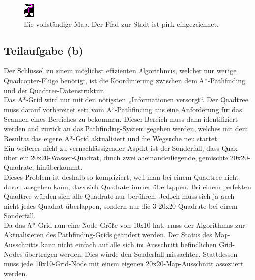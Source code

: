 \documentclass[a4paper,12pt]{article}
\begin{document}
\begin{figure}[H]
\centering
    \includegraphics[width=.5\linewidth]{Bilder/Aufgabe3/Teilaufgabe_A/Beispiel_04.png}
    \caption{Die vollständige Map. Der Pfad zur Stadt ist pink eingezeichnet.}
\end{figure}

\subsection{Teilaufgabe (b)}
Der Schlüssel zu einem möglichst effizienten Algorithmus, welcher nur wenige Quadcopter-Flüge benötigt, ist die Koordinierung zwischen dem A*-Pathfinding und der Quadtree-Datenstruktur.
\\[0.4cm]
Das A*-Grid wird nur mit den nötigsten „Informationen versorgt“.
Der Quadtree muss darauf vorbereitet sein vom A*-Pathfinding aus eine Anforderung für das Scannen eines Bereiches zu bekommen. Dieser Bereich muss dann identifiziert werden und zurück an das Pathfinding-System gegeben werden, welches mit dem Resultat das eigene A*-Grid aktualisiert und die Wegsuche neu startet.
\\[0.4cm]
Ein weiterer nicht zu vernachlässigender Aspekt ist der Sonderfall, dass Quax über ein 20x20-Wasser-Quadrat, durch zwei aneinanderliegende, gemischte 20x20-Quadrate, hinüberkommt.
\\[0.4cm]
Dieses Problem ist deshalb so kompliziert, weil man bei einem Quadtree nicht davon ausgehen kann, dass sich Quadrate immer überlappen. Bei einem perfekten Quadtree würden sich alle Quadrate nur berühren. Jedoch muss sich ja auch nicht jedes Quadrat überlappen, sondern nur die 3 20x20-Quadrate bei einem Sonderfall.
\\[0.4cm]
Da das A*-Grid nun eine Node-Größe von 10x10 hat, muss der Algorithmus zur Aktualisieren des Pathfinding-Grids geändert werden. Der Status des Map-Ausschnitts kann nicht einfach auf alle sich im Ausschnitt befindlichen Grid-Nodes übertragen werden. Dies würde den Sonderfall missachten. Stattdessen muss jede 10x10-Grid-Node mit einem eigenen 20x20-Map-Ausschnitt assoziiert werden. 
\end{document}
